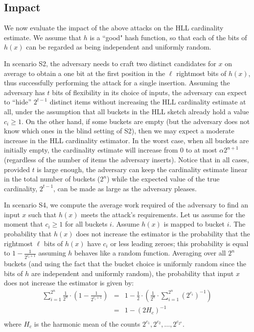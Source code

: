\documentclass[11pt]{article}
\begin{document}
\subsection{Impact}
We now evaluate the impact of the above attacks on the HLL cardinality estimate. We assume that $h$ is a ``good" hash function, so that each of the bits of $h(x)$ can be regarded as being independent and uniformly random.

In scenario S2, the adversary needs to craft two distinct candidates for $x$ on average to obtain a one bit at the first position in the $\ell$ rightmost bits of $h(x)$, thus successfully performing the attack for a single insertion. Assuming the adversary has $t$ bits of flexibility in its choice of inputs, the adversary can expect to ``hide''  $2^{t-1}$ distinct items without increasing the HLL cardinality estimate at all, under the assumption that all buckets in the HLL sketch already hold a value $c_i \ge 1$. On the other hand, if some buckets are empty (but the adversary does not know which ones in the blind setting of S2), then we may expect a moderate increase in the HLL cardinality estimator. In the worst case, when all buckets are initially empty, the cardinality estimate will increase from 0 to at most $\alpha2^{n+1}$ (regardless of the number of items the adversary inserts). Notice that in all cases, provided $t$ is large enough, the adversary can keep the cardinality estimate linear in the total number of buckets ($2^n$) while the expected value of the true cardinality, $2^{t-1}$, can be made as large as the adversary pleases.

In scenario S4, we compute the average work required of the adversary to find an input $x$ such that $h(x)$ meets the attack's requirements. Let us assume for the moment that $c_i \ge 1$ for all buckets $i$. Assume $h(x)$ is mapped to bucket $i$. The probability that $h(x)$ does not increase the estimator is the probability that the  rightmost $\ell$ bits of $h(x)$ have $c_i$ or less leading zeroes; this probability is equal to $1-\frac{1}{2^{c_i+1}}$ assuming $h$ behaves like a random function. Averaging over all $2^n$ buckets (and using the fact that the bucket choice is uniformly random since the bits of $h$ are independent and uniformly random), the probability that input $x$ does not increase the estimator is given by:
\begin{eqnarray*}
\sum_{i=1}^{2^n}\frac{1}{2^n} \cdot (1-\frac{1}{2^{c_i+1}}) & = & 1-\frac{1}{2}\cdot (\frac{1}{2^n}\cdot \sum_{i=1}^{2^n} {(2^{c_i})}^{-1}) \\
& = &1-(2H_c)^{-1} \\
\end{eqnarray*}
where $H_c$ is the harmonic mean of the counts $2^{c_1}, 2^{c_2}, \ldots, 2^{c_{2^n}}$.
\end{document}
